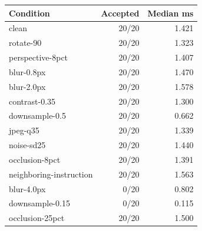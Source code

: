 \begin{tabular}{lrr}
\toprule
Condition & Accepted & Median ms \\
\midrule
clean & 20/20 & 1.421 \\
rotate-90 & 20/20 & 1.323 \\
perspective-8pct & 20/20 & 1.407 \\
blur-0.8px & 20/20 & 1.470 \\
blur-2.0px & 20/20 & 1.578 \\
contrast-0.35 & 20/20 & 1.300 \\
downsample-0.5 & 20/20 & 0.662 \\
jpeg-q35 & 20/20 & 1.339 \\
noise-sd25 & 20/20 & 1.440 \\
occlusion-8pct & 20/20 & 1.391 \\
neighboring-instruction & 20/20 & 1.563 \\
blur-4.0px & 0/20 & 0.802 \\
downsample-0.15 & 0/20 & 0.115 \\
occlusion-25pct & 20/20 & 1.500 \\
\bottomrule
\end{tabular}
